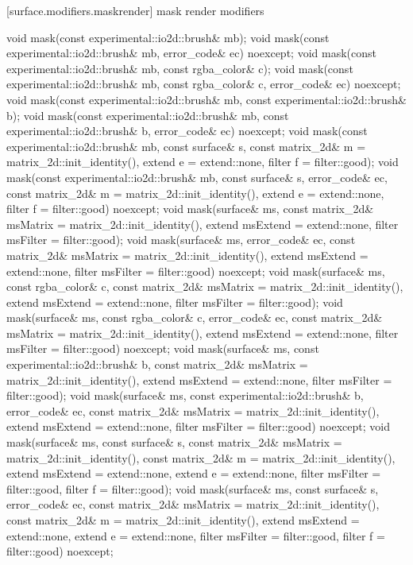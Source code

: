  [surface.modifiers.maskrender] { mask render modifiers}

\begin{itemdecl}
void mask(const experimental::io2d::brush& mb);
void mask(const experimental::io2d::brush& mb, error_code& ec)
  noexcept;
void mask(const experimental::io2d::brush& mb, const rgba_color& c);
void mask(const experimental::io2d::brush& mb, const rgba_color& c, 
  error_code& ec) noexcept;
void mask(const experimental::io2d::brush& mb,
  const experimental::io2d::brush& b);
void mask(const experimental::io2d::brush& mb,
  const experimental::io2d::brush& b, error_code& ec) noexcept;
void mask(const experimental::io2d::brush& mb, const surface& s,
  const matrix_2d& m = matrix_2d::init_identity(), extend e = extend::none, 
  filter f = filter::good);
void mask(const experimental::io2d::brush& mb, const surface& s, error_code& ec,
  const matrix_2d& m = matrix_2d::init_identity(), extend e = extend::none,
  filter f = filter::good) noexcept;
void mask(surface& ms,
  const matrix_2d& msMatrix = matrix_2d::init_identity(),
  extend msExtend = extend::none, filter msFilter = filter::good);
void mask(surface& ms, error_code& ec, 
  const matrix_2d& msMatrix = matrix_2d::init_identity(),
  extend msExtend = extend::none, filter msFilter = filter::good) noexcept;
void mask(surface& ms, const rgba_color& c,
  const matrix_2d& msMatrix = matrix_2d::init_identity(),
  extend msExtend = extend::none, filter msFilter = filter::good);
void mask(surface& ms, const rgba_color& c, error_code& ec, 
  const matrix_2d& msMatrix = matrix_2d::init_identity(),
  extend msExtend = extend::none, filter msFilter = filter::good) noexcept;
void mask(surface& ms, const experimental::io2d::brush& b, 
  const matrix_2d& msMatrix = matrix_2d::init_identity(),
  extend msExtend = extend::none, filter msFilter = filter::good);
void mask(surface& ms, const experimental::io2d::brush& b, error_code& ec,
  const matrix_2d& msMatrix = matrix_2d::init_identity(),
  extend msExtend = extend::none, filter msFilter = filter::good) noexcept;
void mask(surface& ms, const surface& s,
  const matrix_2d& msMatrix = matrix_2d::init_identity(),
  const matrix_2d& m = matrix_2d::init_identity(),
  extend msExtend = extend::none, extend e = extend::none,
  filter msFilter = filter::good, filter f = filter::good);
void mask(surface& ms, const surface& s, error_code& ec,
  const matrix_2d& msMatrix = matrix_2d::init_identity(),
  const matrix_2d& m = matrix_2d::init_identity(),
  extend msExtend = extend::none, extend e = extend::none,
  filter msFilter = filter::good, filter f = filter::good) noexcept;
\end{itemdecl}
